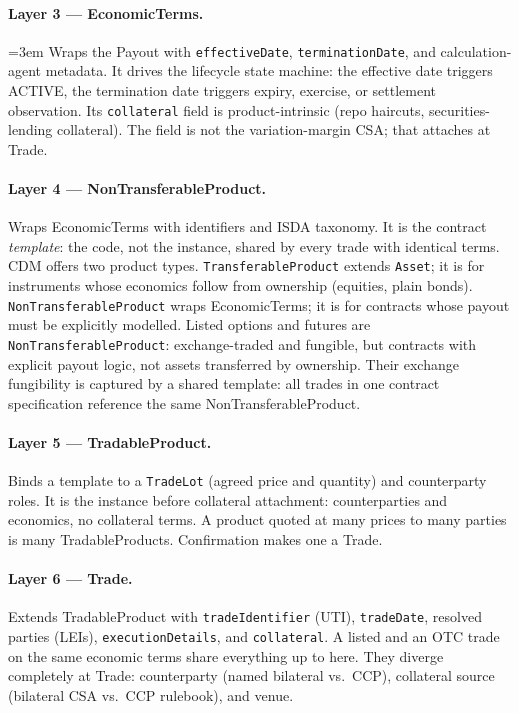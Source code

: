 \paragraph{Layer 3 --- EconomicTerms.} {\emergencystretch=3em Wraps the Payout with \texttt{effective\allowbreak Date}, \texttt{termination\allowbreak Date}, and calculation-agent metadata. It drives the lifecycle state machine: the effective date triggers ACTIVE, the termination date triggers expiry, exercise, or settlement observation. Its \texttt{collateral} field is product-intrinsic (repo haircuts, securities-lending collateral). The field is not the variation-margin CSA; that attaches at Trade.\par}

\paragraph{Layer 4 --- NonTransferableProduct.} Wraps EconomicTerms with identifiers and ISDA taxonomy. It is the contract \emph{template}: the code, not the instance, shared by every trade with identical terms. CDM offers two product types. \texttt{Transferable\allowbreak Product} extends \texttt{Asset}; it is for instruments whose economics follow from ownership (equities, plain bonds). \texttt{Non\allowbreak Transferable\allowbreak Product} wraps EconomicTerms; it is for contracts whose payout must be explicitly modelled. Listed options and futures are \texttt{Non\allowbreak Transferable\allowbreak Product}: exchange-traded and fungible, but contracts with explicit payout logic, not assets transferred by ownership. Their exchange fungibility is captured by a shared template: all trades in one contract specification reference the same NonTransferableProduct.

\paragraph{Layer 5 --- TradableProduct.} Binds a template to a \texttt{TradeLot} (agreed price and quantity) and counterparty roles. It is the instance before collateral attachment: counterparties and economics, no collateral terms. A product quoted at many prices to many parties is many TradableProducts. Confirmation makes one a Trade.

\paragraph{Layer 6 --- Trade.} Extends TradableProduct with \texttt{tradeIdentifier} (UTI), \texttt{tradeDate}, resolved parties (LEIs), \texttt{executionDetails}, and \texttt{collateral}. A listed and an OTC trade on the same economic terms share everything up to here. They diverge completely at Trade: counterparty (named bilateral vs.\ CCP), collateral source (bilateral CSA vs.\ CCP rulebook), and venue.

